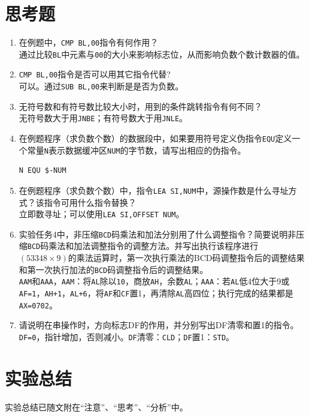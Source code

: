 \documentclass[11pt]{SEU-Digital-Report}
\begin{document}
\section{思考题}
\begin{enumerate}
    \item 在例题中，\texttt{CMP BL,00}指令有何作用？\\
    通过比较\texttt{BL}中元素与\texttt{00}的大小来影响标志位，从而影响负数个数计数器的值。
    \item \texttt{CMP BL,00}指令是否可以用其它指令代替?\\
    可以。通过\texttt{SUB BL,00}来判断是是否为负数。
    \item 无符号数和有符号数比较大小时，用到的条件跳转指令有何不同？\\
    无符号数大于用\texttt{JNBE}；有符号数大于用\texttt{JNLE}。
    \item 在例题程序（求负数个数）的数据段中，如果要用符号定义伪指令\texttt{EQU}定义一个常量\texttt{N}表示数据缓冲区\texttt{NUM}的字节数，请写出相应的伪指令。\\
    \begin{lstlisting}[language={[x86masm]Assembler},title=code]
    N EQU $-NUM
    \end{lstlisting}
    \item 在例题程序（求负数个数）中，指令\texttt{LEA SI,NUM}中，源操作数是什么寻址方式？该指令可用什么指令替换？\\
    立即数寻址；可以使用\texttt{LEA SI,OFFSET NUM}。
    \item 实验任务4中，非压缩\texttt{BCD}码乘法和加法分别用了什么调整指令？简要说明非压缩\texttt{BCD}码乘法和加法调整指令的调整方法。并写出执行该程序进行$(53348\times 9)$的乘法运算时，第一次执行乘法的BCD码调整指令后的调整结果和第一次执行加法的\texttt{BCD}码调整指令后的调整结果。\\
    \texttt{AAM}和\texttt{AAA}，\texttt{AAM}：将\texttt{AL}除以\texttt{10}，商放\texttt{AH}，余数\texttt{AL}；\texttt{AAA}：若\texttt{AL}低4位大于9或\texttt{AF=1}，\texttt{AH+1}，\texttt{AL+6}，将\texttt{AF}和\texttt{CF}置1，再清除\texttt{AL}高四位；执行完成的结果都是\texttt{AX=0702}。
    \item 请说明在串操作时，方向标志DF的作用，并分别写出DF清零和置1的指令。\\
    \texttt{DF=0}，指针增加，否则减小。\texttt{DF}清零：\texttt{CLD}；\texttt{DF}置1：\texttt{STD}。

\end{enumerate}

\section{实验总结}
实验总结已随文附在“注意”、“思考”、“分析”中。

\printbibliography
\end{document}
